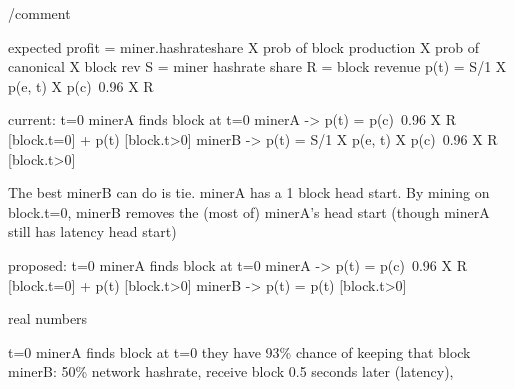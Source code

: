 \documentclass[11pt]{article}
\theoremstyle{plain}
\newcommand{\comment}[1]{}
\begin{document}
{\begin{equation}

\end{equation}




/comment{
        expected profit = miner.hashrateshare X prob of block production X prob of canonical X block rev
        S = miner hashrate share
        R = block revenue
        p(t) = S/1 X p(e, t) X p(c)~0.96 X R

        current:
        t=0
        minerA finds block at t=0
        minerA -> p(t) = p(c)~0.96 X R [block.t=0] + p(t) [block.t>0]
        minerB -> p(t) = S/1 X p(e, t) X p(c)~0.96 X R [block.t>0]

        The best minerB can do is tie. minerA has a 1 block head start.
        By mining on block.t=0, minerB removes the (most of) minerA's head start (though minerA still has latency head start)

        proposed:
        t=0
        minerA finds block at t=0
        minerA -> p(t) = p(c)~0.96 X R [block.t=0] + p(t) [block.t>0]
        minerB -> p(t) = p(t) [block.t>0]


        real numbers

        t=0
        minerA finds block at t=0
        they have 93\% chance of keeping that block
        minerB: 50\% network hashrate, receive block 0.5 seconds later (latency),


    }



\comment{Because the TABS adjustment rate is equal to or less than that of Difficulty in all cases,
    we can show that PoW mining remains the primary driver of chain-growth.

%
%

    A: Difficulty+, TABS-
B: Difficulty0, TABS+
    => B

    \begin{equation}
    (H_d + \frac{H_d}{2048})
        \times (H_k - \frac{H_k}{2049}) > (H_d + 0) \times (H_k + \frac{H_k}{2049})
    \end{equation}

    \begin{equation}
    (H_d + \frac{H_d}{2048})
        \times (H_k - \frac{H_k}{2049}) > (H_d + 0) \times (H_k + \frac{H_k}{2049})
    \end{equation}


}}
\end{document}
